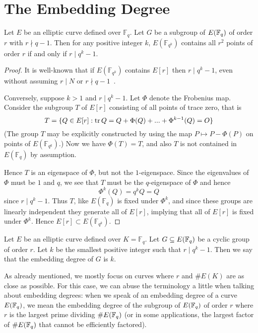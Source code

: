 \section {The Embedding Degree}

\begin{theorem}
Let $E$ be an elliptic curve defined over $\mathbb{F}_q$.
Let $G$ be a subgroup of $E(\mathbb{F}_q)$ of order $r$ with
$r \nmid q-1$.
Then for any positive integer $k$,
$E(\mathbb{F}_{q^k})$ contains all $r^2$
points of order $r$ if and only if $r \mid q^k - 1$.
\end{theorem}

\begin{proof}
It is well-known that if $E(\mathbb{F}_{q^k})$ contains $E[r]$
then $r \mid q^k - 1$, even without assuming $r \mid N$ or
$r \nmid q-1$~\cite{bk}.

Conversely, suppose $k > 1$ and $r \mid q^k - 1$.
Let $\Phi$ denote the Frobenius map. Consider the subgroup $T$ of $E[r]$
consisting of all points of trace zero, that is
\[
T = \{ Q \in E[r] : \mathop{\rm tr} Q = Q + \Phi(Q) + ... + \Phi^{k-1}(Q) = O \}
\]
(The group $T$ may be explicitly constructed by using the map $P \mapsto
P - \Phi(P)$ on points of $E(\mathbb{F}_{q^k})$.)
Now we have $\Phi(T) = T$, and also $T$ is not contained
in $E(\mathbb{F}_q)$ by assumption.

Hence $T$ is an eigenspace of $\Phi$, but not the $1$-eigenspace. Since the
eigenvalues of $\Phi$ must be $1$ and $q$, we see that $T$ must be the
$q$-eigenspace of $\Phi$ and hence
\[
\Phi^k(Q) = q^k Q = Q
\]
since $r \mid q^k - 1$. Thus $T$, like $E(\mathbb{F}_q)$ is fixed under
$\Phi^k$, and since these groups are linearly independent they generate all
of $E[r]$, implying that all of $E[r]$ is fixed under $\Phi^k$. Hence
$E[r] \subset E(\mathbb{F}_{q^k})$.
\end{proof}

\begin{definition}
Let $E$ be an elliptic curve defined over $K = \mathbb{F}_q$.
Let $G \subseteq E(\mathbb{F}_q)$ be a cyclic group of order $r$.
Let $k$ be the smallest positive integer such that $r \mid q^k - 1$.
Then we say that the embedding degree of $G$ is $k$.
\end{definition}

As already mentioned, we mostly focus on curves where
$r$ and $\#E(K)$ are as close as possible.
For this case, we can abuse the terminology a little
when talking about embedding degrees: when we speak of an embedding degree
of a curve $E(\mathbb{F}_q)$, we mean the embedding degree of the subgroup of
$E(\mathbb{F}_q)$ of order $r$ where $r$ is the largest prime dividing $\#E(\mathbb{F}_q)$
(or in some applications, the largest factor of $\#E(\mathbb{F}_q)$ that cannot be
efficiently factored).

